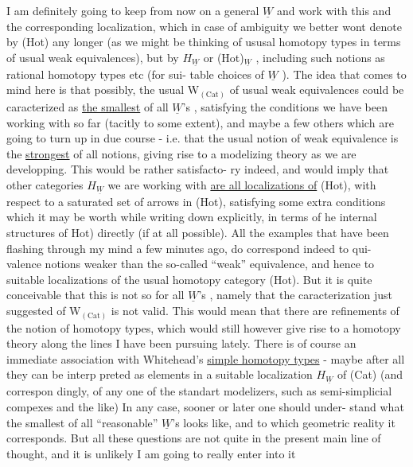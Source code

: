 
I am definitely going to keep from now on a general $\underline{W}$ and work with
this and the corresponding localization,  which in case of ambiguity we
better wont denote by (Hot) any longer (as we might be thinking of ususal
homotopy types in terms of usual weak equivalences),  but by $H_{\underline{W}}$  or
(Hot)$_{\underline{W}}$ ,  including such notions as rational homotopy types etc (for sui-%
table choices of $\underline{W}$ ).  The idea that  comes to mind here is that possibly,
the usual W$_{(\text{Cat})}$ of usual weak equivalences could be caracterized as
 \uline{the smallest}  of all $\underline{W}$'s ,  satisfying the conditions we have been working
with  so far (tacitly to some extent),  and maybe a few others
which are going to turn up in due course  -  i.e. that the usual notion
of weak equivalence is the \uline{strongest}  of all notions,  giving rise to a
modelizing theory as we are developping.  This would be rather satisfacto-%
ry indeed,  and would imply that  other categories $H_{\underline{W}}$ we are working
with \uline{are all localizations of} (Hot),  with respect to a saturated set of
arrows in (Hot),  satisfying some extra conditions which it may be worth
while writing down explicitly,  in terms of he internal structures of
\hand{(}Hot) directly (if at all possible).  All the examples that have been
flashing through my mind a few minutes ago,  do correspond indeed to qui-%
valence notions weaker than the so-called ``weak'' equivalence,  and hence
to suitable localizations of the usual homotopy category (Hot).  But it
is quite conceivable that this is not so for all $\underline{W}$'s ,  namely that the
caracterization  just suggested of W$_{(\text{Cat})}$ is not valid.  This would mean
that there are  refinements of the  notion of homotopy types,  which would
still however give rise to a homotopy theory along the lines I have been
pursuing lately.  There is of course an immediate association with
Whitehead's  \uline{simple homotopy types}  -  maybe after all they can be interp%
preted as elements in a suitable localization $H_{\underline{W}}$  of (Cat)  (and correspon%
dingly,  of any one of the standart modelizers,  such as semi-simplicial
compexes and the like)  In any case,  sooner or later one should under-%
stand what the smallest of all ``reasonable'' $\underline{W}$'s looks like,  and to which
geometric reality it corresponds.  But all these questions are not quite
in the present main line of thought,  and it is unlikely I am going to
really enter into it 

